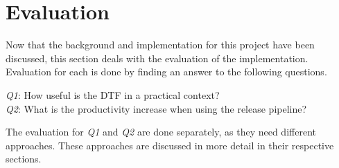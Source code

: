 \chapter{Evaluation}\label{ch:evaluation}

Now that the background and implementation for this project have been discussed, this section deals with the evaluation of the implementation.
Evaluation for each is done by finding an answer to the following questions.

\textit{Q1}: How useful is the DTF in a practical context? \\
\textit{Q2}: What is the productivity increase when using the release pipeline?

The evaluation for \textit{Q1} and \textit{Q2} are done separately, as they need different approaches.
These approaches are discussed in more detail in their respective sections.



